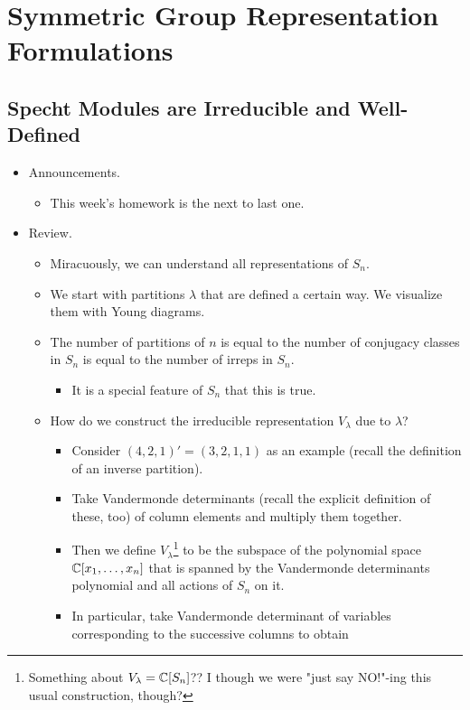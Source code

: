 \documentclass[../notes.tex]{subfiles}
\begin{document}
\chapter{Symmetric Group Representation Formulations}
\section{Specht Modules are Irreducible and Well-Defined}
\begin{itemize}
    \item {}Announcements.
    \begin{itemize}
        \item This week's homework is the next to last one.
    \end{itemize}
    \item Review.
    \begin{itemize}
        \item Miracuously, we can understand all representations of $S_n$.
        \item We start with partitions $\lambda$ that are defined a certain way. We visualize them with Young diagrams.
        \item The number of partitions of $n$ is equal to the number of conjugacy classes in $S_n$ is equal to the number of irreps in $S_n$.
        \begin{itemize}
            \item It is a special feature of $S_n$ that this is true.
        \end{itemize}
        \item How do we construct the irreducible representation $V_\lambda$ due to $\lambda$?
        \begin{itemize}
            \item Consider $(4,2,1)'=(3,2,1,1)$ as an example (recall the definition of an inverse partition).
            \item Take Vandermonde determinants (recall the explicit definition of these, too) of column elements and multiply them together.
            \item Then we define $V_\lambda$\footnote{Something about $V_\lambda=\mathbb{C}[S_n]$?? I though we were "just say NO!"-ing this usual construction, though?} to be the subspace of the polynomial space $\mathbb{C}[x_1,\dots,x_n]$ that is spanned by the Vandermonde determinants polynomial and all actions of $S_n$ on it.
            \item In particular, take Vandermonde determinant of variables corresponding to the successive columns to obtain

\end{itemize}
\end{itemize}
\end{itemize}
\end{document}
